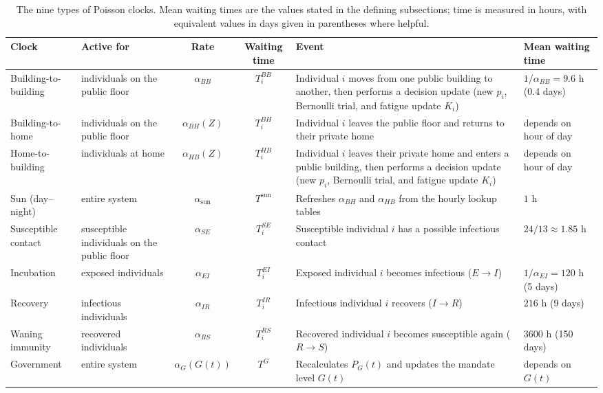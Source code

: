 \documentclass[11pt]{article}
\theoremstyle{definition}
\theoremstyle{plain}
\begin{document}
\begin{table}[H]
\centering
\caption{The nine types of Poisson clocks. Mean waiting times are the values stated in the defining subsections; time is measured in hours, with equivalent values in days given in parentheses where helpful.}
\label{tab:clocks}
\footnotesize
\renewcommand{\arraystretch}{1.35}
\begin{tabularx}{\textwidth}{@{}>{\raggedright\arraybackslash}p{2.1cm} >{\raggedright\arraybackslash}p{2.4cm} c c >{\raggedright\arraybackslash}X >{\raggedright\arraybackslash}p{2.5cm}@{}}
\toprule
\textbf{Clock} & \textbf{Active for} & \textbf{Rate} & \textbf{Waiting time} & \textbf{Event} & \textbf{Mean waiting time} \\
\midrule
Building-to-building & individuals on the public floor & $\alpha_{BB}$ & $T_i^{BB}$ & Individual $i$ moves from one public building to another, then performs a decision update (new $p_i$, Bernoulli trial, and fatigue update $K_i$) & $1/\alpha_{BB}=9.6$ h (0.4 days) \\
Building-to-home & individuals on the public floor & $\alpha_{BH}(Z)$ & $T_i^{BH}$ & Individual $i$ leaves the public floor and returns to their private home & depends on hour of day \\
Home-to-building & individuals at home & $\alpha_{HB}(Z)$ & $T_i^{HB}$ & Individual $i$ leaves their private home and enters a public building, then performs a decision update (new $p_i$, Bernoulli trial, and fatigue update $K_i$) & depends on hour of day \\
Sun (day--night) & entire system & $\alpha_{\mathrm{sun}}$ & $T^{\mathrm{sun}}$ & Refreshes $\alpha_{BH}$ and $\alpha_{HB}$ from the hourly lookup tables & $1$ h \\
Susceptible contact & susceptible individuals on the public floor
& $\alpha_{SE}$ & $T_i^{SE}$ & Susceptible individual $i$ has a possible infectious contact & $24/13\approx 1.85$ h \\
Incubation & exposed individuals & $\alpha_{EI}$ & $T_i^{EI}$ & Exposed individual $i$ becomes infectious ($E\to I$) & $1/\alpha_{EI}=120$ h (5 days) \\
Recovery & infectious individuals & $\alpha_{IR}$ & $T_i^{IR}$ & Infectious individual $i$ recovers ($I\to R$) & $216$ h (9 days) \\
Waning immunity & recovered individuals & $\alpha_{RS}$ & $T_i^{RS}$ & Recovered individual $i$ becomes susceptible again ($R\to S$) & $3600$ h (150 days) \\
Government & entire system & $\alpha_G(G(t))$ & $T^{G}$ & Recalculates $P_G(t)$ and updates the mandate level $G(t)$ & depends on $G(t)$ \\
\bottomrule
\end{tabularx}
\end{table}
\end{document}
